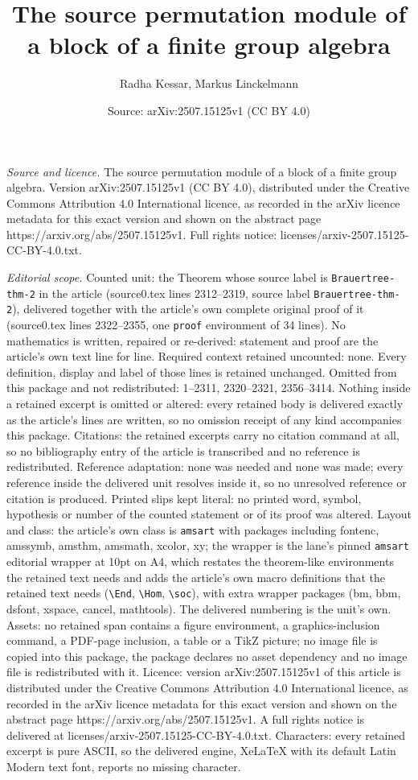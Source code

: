 \documentclass[10pt,a4paper]{amsart}
\title[The source permutation module of a block of a finite group a]{The source permutation module of a block of a finite group algebra}
\author{Radha Kessar, Markus Linckelmann}
\date{Source: arXiv:2507.15125v1 (CC BY 4.0)}
\begin{document}
\maketitle

\noindent\emph{Source and licence.} The source permutation module of a block of a finite group algebra. Version arXiv:2507.15125v1 (CC BY 4.0), distributed under the Creative Commons Attribution 4.0 International licence, as recorded in the arXiv licence metadata for this exact version and shown on the abstract page https://arxiv.org/abs/2507.15125v1. Full rights notice: licenses/arxiv-2507.15125-CC-BY-4.0.txt.\par\smallskip

\noindent\textit{Editorial scope.} Counted unit: the Theorem whose source label is \texttt{Brauertree-thm-2} in the article (source0.tex lines 2312--2319, source label \texttt{Brauertree-thm-2}), delivered together with the article's own complete original proof of it (source0.tex lines 2322--2355, one \texttt{proof} environment of 34 lines). No mathematics is written, repaired or re-derived: statement and proof are the article's own text line for line. Required context retained uncounted: none. Every definition, display and label of those lines is retained unchanged. Omitted from this package and not redistributed: 1--2311, 2320--2321, 2356--3414. Nothing inside a retained excerpt is omitted or altered: every retained body is delivered exactly as the article's lines are written, so no omission receipt of any kind accompanies this package. Citations: the retained excerpts carry no citation command at all, so no bibliography entry of the article is transcribed and no reference is redistributed. Reference adaptation: none was needed and none was made; every reference inside the delivered unit resolves inside it, so no unresolved reference or citation is produced. Printed slips kept literal: no printed word, symbol, hypothesis or number of the counted statement or of its proof was altered. Layout and class: the article's own class is \texttt{amsart} with packages including fontenc, amssymb, amsthm, amsmath, xcolor, xy; the wrapper is the lane's pinned \texttt{amsart} editorial wrapper at 10pt on A4, which restates the theorem-like environments the retained text needs and adds the article's own macro definitions that the retained text needs (\texttt{\textbackslash End}, \texttt{\textbackslash Hom}, \texttt{\textbackslash soc}), with extra wrapper packages (bm, bbm, dsfont, xspace, cancel, mathtools). The delivered numbering is the unit's own. Assets: no retained span contains a figure environment, a graphics-inclusion command, a PDF-page inclusion, a table or a TikZ picture; no image file is copied into this package, the package declares no asset dependency and no image file is redistributed with it. Licence: version arXiv:2507.15125v1 of this article is distributed under the Creative Commons Attribution 4.0 International licence, as recorded in the arXiv licence metadata for this exact version and shown on the abstract page https://arxiv.org/abs/2507.15125v1. A full rights notice is delivered at licenses/arxiv-2507.15125-CC-BY-4.0.txt. Characters: every retained excerpt is pure ASCII, so the delivered engine, XeLaTeX with its default Latin Modern text font, reports no missing character.
\end{document}
